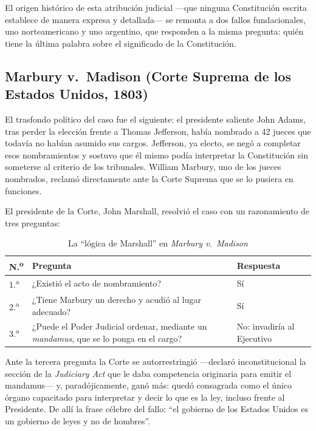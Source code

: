 \documentclass[12pt,oneside]{book}
\begin{document}
El origen histórico de esta atribución judicial —que ninguna Constitución escrita
establece de manera expresa y detallada— se remonta a dos fallos fundacionales,
uno norteamericano y uno argentino, que responden a la misma pregunta: quién tiene
la última palabra sobre el significado de la Constitución.

\subsection{Marbury v.\ Madison (Corte Suprema de los Estados Unidos, 1803)}

El trasfondo político del caso fue el siguiente: el presidente saliente John Adams,
tras perder la elección frente a Thomas Jefferson, había nombrado a 42 jueces que
todavía no habían asumido sus cargos. Jefferson, ya electo, se negó a completar esos
nombramientos y sostuvo que él mismo podía interpretar la Constitución sin
someterse al criterio de los tribunales. William Marbury, uno de los jueces
nombrados, reclamó directamente ante la Corte Suprema que se lo pusiera en
funciones.

El presidente de la Corte, John Marshall, resolvió el caso con un razonamiento de
tres preguntas:

\begin{table}[H]
\centering
\caption{La ``lógica de Marshall'' en \textit{Marbury v.\ Madison}}
\begin{tabularx}{\textwidth}{@{}p{}Xl@{}}
\toprule
\textbf{N.\textsuperscript{o}} & \textbf{Pregunta} & \textbf{Respuesta} \\
\midrule
1.\textsuperscript{a} & ¿Existió el acto de nombramiento? & Sí \\
2.\textsuperscript{a} & ¿Tiene Marbury un derecho y acudió al lugar adecuado? & Sí \\
3.\textsuperscript{a} & ¿Puede el Poder Judicial ordenar, mediante un
\textit{mandamus}, que se lo ponga en el cargo? & No: invadiría al Ejecutivo \\
\bottomrule
\end{tabularx}
\end{table}

Ante la tercera pregunta la Corte se autorrestringió —declaró inconstitucional la
sección de la \textit{Judiciary Act} que le daba competencia originaria para
emitir el mandamus— y, paradójicamente, ganó más: quedó consagrada como el único
órgano capacitado para interpretar y decir lo que es la ley, incluso frente al
Presidente. De allí la frase célebre del fallo: ``el gobierno de los Estados
Unidos es un gobierno de leyes y no de hombres''.
\end{document}
